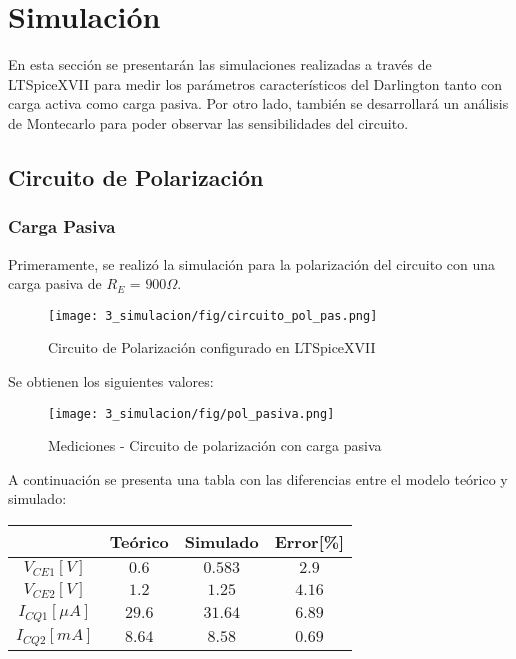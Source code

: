 \chapter{Simulación}
En esta sección se presentarán las simulaciones realizadas a través de LTSpiceXVII para medir los parámetros 
característicos del Darlington tanto con carga activa como carga pasiva. Por otro lado, también se desarrollará 
un análisis de Montecarlo para poder observar las sensibilidades del circuito.


\section{Circuito de Polarización}

\subsection{Carga Pasiva}

Primeramente, se realizó la simulación para la polarización del circuito con una carga pasiva de $R_E$ = $900 \Omega$.
\begin{figure}[H]
    \centering
    \texttt{[image: 3\_simulacion/fig/circuito\_pol\_pas.png]}
    \label{circuito_pol_pas}
    \caption{Circuito de Polarización configurado en LTSpiceXVII}
\end{figure}

Se obtienen los siguientes valores:

\begin{figure}[H]
    \centering
    \texttt{[image: 3\_simulacion/fig/pol\_pasiva.png]}
    \label{mediciones_pol_pas}
    \caption{Mediciones - Circuito de polarización con carga pasiva}
\end{figure}

A continuación se presenta una tabla con las diferencias entre el modelo teórico y simulado:

\begin{table}[H]
    \centering
    \begin{tabular}{|c|c|c|c|}
    \hline
                        & Teórico & Simulado & Error[\%] \\ \hline
    $V_{CE1}[V]$        & $0.6$   & $0.583$  & $2.9$    \\ \hline
    $V_{CE2}[V]$        & $1.2$   & $1.25$   & $4.16$   \\ \hline
    $I_{CQ1}[\mu A]$ & $29.6$  & $31.64$  & $6.89$   \\ \hline  
    $I_{CQ2}[mA]$ & $8.64$  & $8.58$  & $0.69$   \\ \hline
    \end{tabular}
    \end{table}


